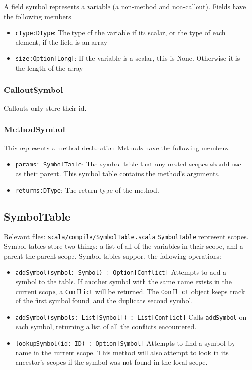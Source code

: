 \documentclass[11pt]{article}
\begin{document}
    A field symbol represents a variable (a non-method and non-callout).
    Fields have the following members:
\begin{itemize}
\item \verb~dType:DType~: The type of the variable if its scalar, or the type of each element, if the field is an array
\item \verb~size:Option[Long]~: If the variable is a scalar, this is None. Otherwise it is the length of the array
\end{itemize}
\subsubsection{CalloutSymbol}
\label{sec-2-1-2}

    Callouts only store their id.
\subsubsection{MethodSymbol}
\label{sec-2-1-3}

    This represents a method declaration
    Methods have the following members:
\begin{itemize}
\item \verb~params: SymbolTable~: The symbol table that any nested scopes should use as their parent. This symbol table contains the method's arguments.
\item \verb~returns:DType~: The return type of the method.
\end{itemize}
\subsection{SymbolTable}
\label{sec-2-2}

   Relevant files: \verb~scala/compile/SymbolTable.scala~
   \verb~SymbolTable~ represent scopes.
   Symbol tables store two things: a list of all of the variables in their scope,
   and a parent the parent scope.
   Symbol tables support the following operations:
\begin{itemize}
\item \verb~addSymbol(symbol: Symbol) : Option[Conflict]~ Attempts to add a symbol to the table. If another symbol with the same name exists in the current scope, a \verb~Conflict~ will be returned. The \verb~Conflict~ object keeps track of the first symbol found, and the duplicate second symbol.
\item \verb~addSymbol(symbols: List[Symbol]) : List[Conflict]~ Calls \verb~addSymbol~ on each symbol, returning a list of all the conflicts encountered.
\item \verb~lookupSymbol(id: ID) : Option[Symbol]~ Attempts to find a symbol by name in the current scope. This method will also attempt to look in its ancestor's scopes if the symbol was not found in the local scope.
\end{itemize}
\end{document}
